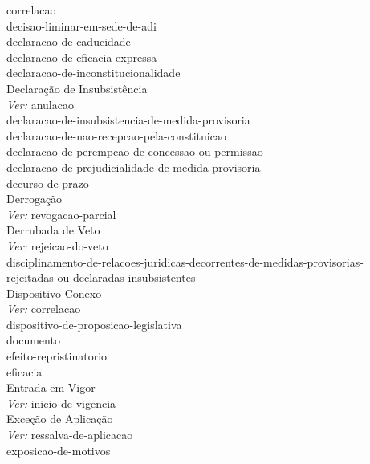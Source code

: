 \Gls{correlacao} \\ 
\Gls{decisao-liminar-em-sede-de-adi} \\ 
\Gls{declaracao-de-caducidade} \\ 
\Gls{declaracao-de-eficacia-expressa} \\ 
\Gls{declaracao-de-inconstitucionalidade} \\ 
Declaração de Insubsistência \\ 
 \hspace*{1.0cm}\glosshsep \textit{Ver:} \Gls{anulacao} \\ 
\Gls{declaracao-de-insubsistencia-de-medida-provisoria} \\ 
\Gls{declaracao-de-nao-recepcao-pela-constituicao} \\ 
\Gls{declaracao-de-perempcao-de-concessao-ou-permissao} \\ 
\Gls{declaracao-de-prejudicialidade-de-medida-provisoria} \\ 
\Gls{decurso-de-prazo} \\ 
Derrogação \\ 
 \hspace*{1.0cm}\glosshsep \textit{Ver:} \Gls{revogacao-parcial} \\ 
Derrubada de Veto \\ 
 \hspace*{1.0cm}\glosshsep \textit{Ver:} \Gls{rejeicao-do-veto} \\ 
\Gls{disciplinamento-de-relacoes-juridicas-decorrentes-de-medidas-provisorias-rejeitadas-ou-declaradas-insubsistentes} \\ 
Dispositivo Conexo \\ 
 \hspace*{1.0cm}\glosshsep \textit{Ver:} \Gls{correlacao} \\ 
\Gls{dispositivo-de-proposicao-legislativa} \\ 
\Gls{documento} \\ 
\Gls{efeito-repristinatorio} \\ 
\Gls{eficacia} \\ 
Entrada em Vigor \\ 
 \hspace*{1.0cm}\glosshsep \textit{Ver:} \Gls{inicio-de-vigencia} \\ 
Exceção de Aplicação \\ 
 \hspace*{1.0cm}\glosshsep \textit{Ver:} \Gls{ressalva-de-aplicacao} \\ 
\Gls{exposicao-de-motivos} \\ 
